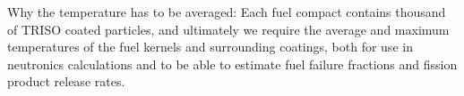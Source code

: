 
Why the temperature has to be averaged:
Each fuel compact contains thousand of TRISO coated particles, and ultimately we require the average and maximum temperatures of the fuel kernels and surrounding coatings, both for use in neutronics calculations and to be able to estimate fuel failure fractions and fission product release rates.